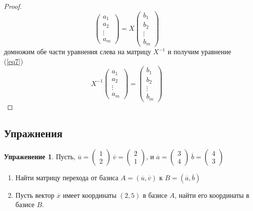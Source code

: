 \documentclass[]{article}
\theoremstyle{theorem}
\theoremstyle{definition}
\newtheorem{tk}{Упраженение}
\begin{document}
\begin{proof}
\begin{equation*}
	\begin{pmatrix}
		a_1
		\\
		a_2
		\\
		\vdots
		\\
		a_m
	\end{pmatrix}
	=X
	\begin{pmatrix}
		b_1
		\\
		b_2
		\\
		\vdots
		\\
		b_m
	\end{pmatrix}
\end{equation*}
домножим обе части уравнения слева на матрицу $X^{-1}$ и получим уравнение (\ref{eq7})
\begin{equation*}
X^{-1}
\begin{pmatrix}
	a_1
	\\
	a_2
	\\
	\vdots
	\\
	a_m
\end{pmatrix}
=
\begin{pmatrix}
	b_1
	\\
	b_2
	\\
	\vdots
	\\
	b_m
\end{pmatrix}
\end{equation*}
\end{proof}

\subsection{Упражнения}
\begin{tk}
	Пусть, $\overline{u}=
	\begin{pmatrix}
	1\\
	2
	\end{pmatrix}\
	\overline{v}=
	\begin{pmatrix}
		2\\
		1
	\end{pmatrix}$,
	и
	$\overline{a}=
	\begin{pmatrix}
		3\\
		4
	\end{pmatrix}\
	\overline{b}=
	\begin{pmatrix}
		4\\
		3
	\end{pmatrix}$
	\begin{enumerate}
		\item
		Найти матрицу перехода от базиса $A=(\overline{u}, \overline{v})$ к $B=(\overline{a}, \overline{b})$ 
		\item
		Пусть вектор $\overline{x}$ имеет координаты $(2,5)$ в базисе $A$, найти его координаты в базисе $B$.
	\end{enumerate}
\end{tk}
\end{document}
